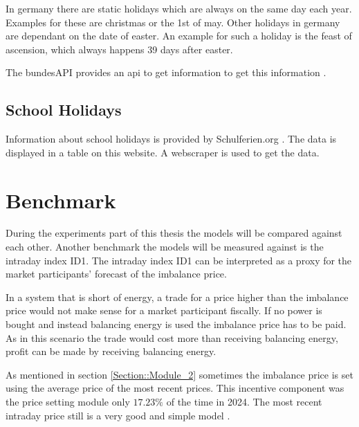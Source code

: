 \documentclass[class=scrbook, crop=false]{standalone}
\begin{document}
In germany there are static holidays which are always on the same day each year.
Examples for these are christmas or the 1st of may. 
Other holidays in germany are dependant on the date of easter. 
An example for such a holiday is the feast of ascension, which always happens 39 days after easter.

The bundesAPI provides an api to get information to get this information \cite{HolidayAPIUrl}.

\subsection{School Holidays}

Information about school holidays is provided by Schulferien.org \cite{SchoolHolidays}. 
The data is displayed in a table on this website. 
A webscraper is used to get the data.

\section{Benchmark}
\label{Section:Benchmark}

During the experiments part of this thesis the models will be compared against each other.
Another benchmark the models will be measured against is the intraday index ID1.
The intraday index ID1 can be interpreted as a proxy for the market participants' forecast of the imbalance price.

In a system that is short of energy, a trade for a price higher than the imbalance price would not make sense for a market participant fiscally.
If no power is bought and instead balancing energy is used the imbalance price has to be paid. 
As in this scenario the trade would cost more than receiving balancing energy, profit can be made by receiving balancing energy.

As mentioned in section \ref{Section::Module_2} sometimes the imbalance price is set using the average price of the most recent prices.
This incentive component was the price setting module only $17.23\%$ of the time in 2024.
The most recent intraday price still is a very good and simple model \cite{narajewskiProbabilisticForecastingGerman2022}.
\end{document}
